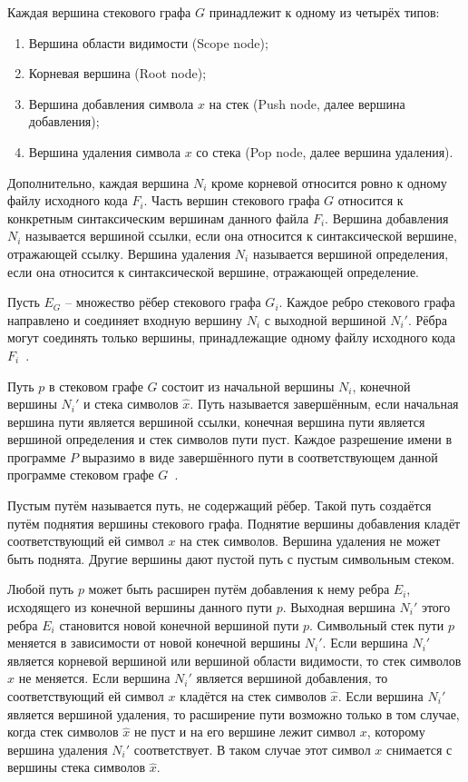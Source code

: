Каждая вершина стекового графа \(G\) принадлежит к одному из четырёх типов:

\begin{enumerate}
\def\labelenumi{\arabic{enumi}.}
\item
  Вершина области видимости (Scope node);
\item
  Корневая вершина (Root node);
\item
  Вершина добавления символа \(x\) на стек (Push node, далее вершина добавления);
\item
  Вершина удаления символа \(x\) со стека (Pop node, далее вершина удаления).
\end{enumerate}

Дополнительно, каждая вершина \(N_{i}\) кроме корневой относится ровно к одному файлу исходного кода \(F_{i}\). Часть вершин стекового графа \(G\) относится к конкретным синтаксическим вершинам данного файла \(F_{i}\). Вершина добавления \(N_{i}\) называется вершиной ссылки, если она относится к синтаксической вершине, отражающей ссылку. Вершина удаления \(N_{i}\) называется вершиной определения, если она относится к синтаксической вершине, отражающей определение.

Пусть \(E_{G}\) -- множество рёбер стекового графа \(G_{i}\). Каждое ребро стекового графа направлено и соединяет входную вершину \(N_{i}\) с выходной вершиной \(N_{i}'\). Рёбра могут соединять только вершины, принадлежащие одному файлу исходного кода \(F_{i}\)~\cite{Creager2023}.

Путь \(p\) в стековом графе \(G\) состоит из начальной вершины \(N_{i}\), конечной вершины \(N_{i}'\) и стека символов \(\widehat{x}\). Путь называется завершённым, если начальная вершина пути является вершиной ссылки, конечная вершина пути является вершиной определения и стек символов пути пуст. Каждое разрешение имени в программе \(P\) выразимо в виде завершённого пути в соответствующем данной программе стековом графе \(G\)~\cite{Creager2023}.

Пустым путём называется путь, не содержащий рёбер. Такой путь создаётся путём поднятия вершины стекового графа. Поднятие вершины добавления кладёт соответствующий ей символ \(x\) на стек символов. Вершина удаления не может быть поднята. Другие вершины дают пустой путь с пустым символьным стеком.

Любой путь \(p\) может быть расширен путём добавления к нему ребра \(E_{i}\), исходящего из конечной вершины данного пути \(p\). Выходная вершина \(N_{i}'\) этого ребра \(E_{i}\) становится новой конечной вершиной пути \(p\). Символьный стек пути \(p\) меняется в зависимости от новой конечной вершины \(N_{i}'\). Если вершина \(N_{i}'\) является корневой вершиной или вершиной области видимости, то стек символов \(\widehat{x}\) не меняется. Если вершина \(N_{i}'\) является вершиной добавления, то соответствующий ей символ \(x\) кладётся на стек символов \(\widehat{x}\). Если вершина \(N_{i}'\) является вершиной удаления, то расширение пути возможно только в том случае, когда стек символов \(\widehat{x}\) не пуст и на его вершине лежит символ \(x\), которому вершина удаления \(N_{i}'\) соответствует. В таком случае этот символ \(x\) снимается с вершины стека символов \(\widehat{x}\).

